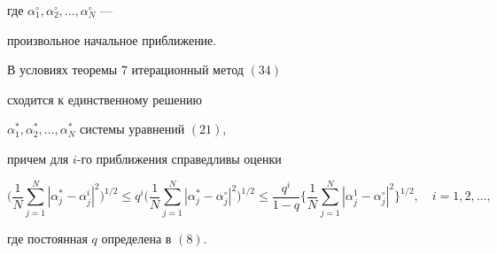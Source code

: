 где $\alpha_1^\circ,\alpha_2^\circ,\dotsc,\alpha_N^\circ$ ---


произвольное начальное приближение.





\begin{thm}


В условиях теоремы $7$ итерационный метод $(34)$


сходится к единственному решению


$\alpha_1^*,\alpha_2^*,\dotsc,\alpha_N^*$ системы уравнений $(21)$,


причем для $i$-го приближения справедливы оценки


\begin{equation}


\biggl(\frac{1}{N}\sum_{j=1}^N|\alpha_j^*-\alpha_j^i|^2\biggr)^{1/2}\leq


q^i \biggl(\frac{1}{N}\sum_{j=1}^N|\alpha_j^*-\alpha_j^\circ


|^2\biggr)^{1/2}\leq


\frac{q^i}{1-q}\biggl\{\frac{1}{N}\sum_{j=1}^N|\alpha_j^1-


\alpha_j^\circ |^2\biggr\}^{1/2},\quad i=1,2,\dotsc,


\end{equation}


где постоянная $q$ определена в $(8)$.


\end{thm}






